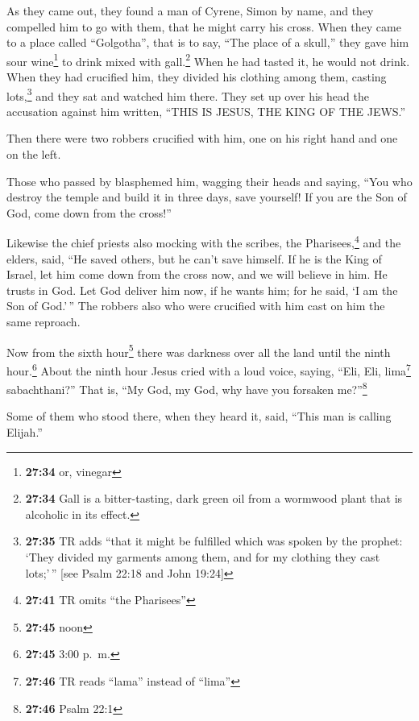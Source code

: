  As they came out, they found a man of Cyrene, Simon by
name, and they compelled him to go with them, that he might carry his
cross.  When they came to a place called ``Golgotha'',
that is to say, ``The place of a skull,''  they gave him
sour wine\footnote{\textbf{27:34} or, vinegar} to drink mixed with
gall.\footnote{\textbf{27:34} Gall is a bitter-tasting, dark green oil
  from a wormwood plant that is alcoholic in its effect.} When he had
tasted it, he would not drink.  When they had crucified
him, they divided his clothing among them, casting lots,\footnote{\textbf{27:35}
  TR adds ``that it might be fulfilled which was spoken by the prophet:
  `They divided my garments among them, and for my clothing they cast
  lots;'\,'' {[}see Psalm 22:18 and John 19:24{]}}  and
they sat and watched him there.  They set up over his
head the accusation against him written, ``THIS IS JESUS, THE KING OF
THE JEWS.''

 Then there were two robbers crucified with him, one on
his right hand and one on the left.

 Those who passed by blasphemed him, wagging their heads
 and saying, ``You who destroy the temple and build it in
three days, save yourself! If you are the Son of God, come down from the
cross!''

 Likewise the chief priests also mocking with the
scribes, the Pharisees,\footnote{\textbf{27:41} TR omits ``the
  Pharisees''} and the elders, said,  ``He saved others,
but he can't save himself. If he is the King of Israel, let him come
down from the cross now, and we will believe in him.  He
trusts in God. Let God deliver him now, if he wants him; for he said, `I
am the Son of God.'\,''  The robbers also who were
crucified with him cast on him the same reproach.

 Now from the sixth hour\footnote{\textbf{27:45} noon}
there was darkness over all the land until the ninth hour.\footnote{\textbf{27:45}
  3:00 p.~m.}  About the ninth hour Jesus cried with a
loud voice, saying, ``Eli, Eli, lima\footnote{\textbf{27:46} TR reads
  ``lama'' instead of ``lima''} sabachthani?'' That is, ``My God, my
God, why have you forsaken me?''\footnote{\textbf{27:46} Psalm 22:1}

 Some of them who stood there, when they heard it, said,
``This man is calling Elijah.''

